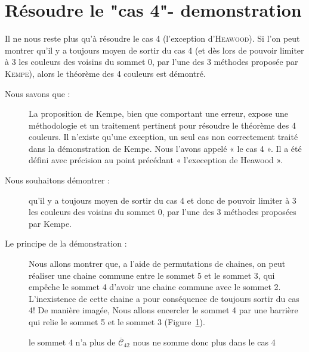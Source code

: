 \documentclass[french]{report}
\begin{document}
\section{Résoudre le "cas 4"- demonstration}
Il ne nous reste plus qu'à résoudre le cas 4  (l'exception d'\textsc{Heawood}). Si l'on peut montrer qu'il y a toujours moyen de sortir du cas 4 (et dès lors de pouvoir limiter à 3 les couleurs des voisins du sommet 0, par l'une des 3 méthodes proposée par \textsc{Kempe}), alors le théorème des 4 couleurs est démontré.
\\
\begin{description}
	\item [Nous savons que :]
La proposition de Kempe, bien que comportant une erreur, expose une méthodologie et un traitement pertinent pour résoudre le théorème des 4 couleurs.
Il n'existe qu'une exception, un seul cas non correctement traité dans la démonstration de Kempe. Nous l'avons appelé « le cas 4 ». Il a été défini avec précision au point précédant « l'exeception de Heawood ».\\

	\item [Nous souhaitons démontrer :]
qu’il y a toujours moyen de sortir du cas 4 et donc de pouvoir limiter à 3 les couleurs des voisins du sommet 0, par l’une des 3 méthodes proposées par Kempe.\\


	\item [Le principe de la démonstration :]
Nous allons montrer que, a l'aide de permutations de chaines, on peut réaliser une chaine commune entre le sommet 5 et le sommet 3, qui empêche le sommet 4 d'avoir une chaine commune avec le sommet 2. L’inexistence de cette chaine a pour conséquence de toujours sortir du cas 4! De manière imagée, Nous allons encercler le sommet 4 par une barrière qui relie le sommet 5 et le sommet 3 (Figure~\ref{fig:cas4_r15_4}).
\end{description}
\FloatBarrier
\begin{figure}[!ht]\centering
		
	\caption{le sommet 4 n'a plus de $\overline{\mathcal{C}}_{42}$ nous ne somme donc plus dans le cas 4}\label{fig:cas4_r15_4}
\end{figure}
\FloatBarrier

\end{document}
